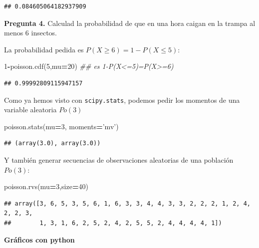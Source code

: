 \documentclass[]{book}
\newenvironment{Shaded}{\begin{snugshade}}{\end{snugshade}}
\newcommand{\CommentTok}[1]{\textcolor[rgb]{0.56,0.35,0.01}{\textit{#1}}}
\newcommand{\DecValTok}[1]{\textcolor[rgb]{0.00,0.00,0.81}{#1}}
\newcommand{\NormalTok}[1]{#1}
\newcommand{\OperatorTok}[1]{\textcolor[rgb]{0.81,0.36,0.00}{\textbf{#1}}}
\newcommand{\StringTok}[1]{\textcolor[rgb]{0.31,0.60,0.02}{#1}}
\begin{document}
\begin{verbatim}
## 0.084605064182937909
\end{verbatim}

\textbf{Pregunta 4.} Calculad la probabilidad de que en una hora caigan en la trampa al menos 6 insectos.

La probabilidad pedida es \(P(X\geq 6)=1-P(X\leq 5)\):

\begin{Shaded}
\begin{Highlighting}[]
\DecValTok{1}\OperatorTok{-}\NormalTok{poisson.cdf(}\DecValTok{5}\NormalTok{,mu}\OperatorTok{=}\DecValTok{20}\NormalTok{) }
\CommentTok{## es 1-P(X<=5)=P(X>=6)}
\end{Highlighting}
\end{Shaded}

\begin{verbatim}
## 0.99992809115947157
\end{verbatim}

Como ya hemos visto con \texttt{scipy.stats}, podemos pedir los momentos de una variable aleatoria
\(Po(3)\)

\begin{Shaded}
\begin{Highlighting}[]
\NormalTok{poisson.stats(mu}\OperatorTok{=}\DecValTok{3}\NormalTok{, moments}\OperatorTok{=}\StringTok{'mv'}\NormalTok{)}
\end{Highlighting}
\end{Shaded}

\begin{verbatim}
## (array(3.0), array(3.0))
\end{verbatim}

Y también generar secuencias de observaciones aleatorias de una población \(Po(3)\):

\begin{Shaded}
\begin{Highlighting}[]
\NormalTok{poisson.rvs(mu}\OperatorTok{=}\DecValTok{3}\NormalTok{,size}\OperatorTok{=}\DecValTok{40}\NormalTok{)}
\end{Highlighting}
\end{Shaded}

\begin{verbatim}
## array([3, 6, 5, 3, 5, 6, 1, 6, 3, 3, 4, 4, 3, 3, 2, 2, 2, 1, 2, 4, 2, 2, 3,
##        1, 3, 1, 6, 2, 5, 2, 4, 2, 5, 5, 2, 4, 4, 4, 4, 1])
\end{verbatim}

\textbf{Gráficos con python}
\end{document}
